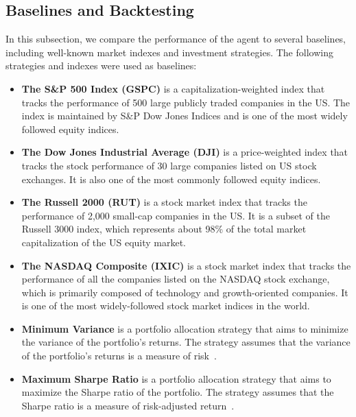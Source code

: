 \documentclass[../xlapes02]{subfiles}
\begin{document}
    \subsection{Baselines and Backtesting}\label{subsec:baselines-and-backtesting}
    In this subsection, we compare the performance of the agent to several baselines, including well-known market indexes and investment strategies. The following strategies and indexes were used as baselines:

    \begin{itemize}
        \item \textbf{The S\&P 500 Index (GSPC)} is a capitalization-weighted index that tracks the performance of 500 large publicly traded companies in the US. The index is maintained by S\&P Dow Jones Indices and is one of the most widely followed equity indices.
        \item \textbf{The Dow Jones Industrial Average (DJI)} is a price-weighted index that tracks the stock performance of 30 large companies listed on US stock exchanges. It is also one of the most commonly followed equity indices.
        \item \textbf{The Russell 2000 (RUT)} is a stock market index that tracks the performance of 2,000 small-cap companies in the US. It is a subset of the Russell 3000 index, which represents about 98\% of the total market capitalization of the US equity market.
        \item \textbf{The NASDAQ Composite (IXIC)} is a stock market index that tracks the performance of all the companies listed on the NASDAQ stock exchange, which is primarily composed of technology and growth-oriented companies. It is one of the most widely-followed stock market indices in the world.
        \item \textbf{Minimum Variance} is a portfolio allocation strategy that aims to minimize the variance of the portfolio's returns. The strategy assumes that the variance of the portfolio's returns is a measure of risk~\cite{investopedia}.
        \item \textbf{Maximum Sharpe Ratio} is a portfolio allocation strategy that aims to maximize the Sharpe ratio of the portfolio. The strategy assumes that the Sharpe ratio is a measure of risk-adjusted return~\cite{investopedia}.
    \end{itemize}
\end{document}
